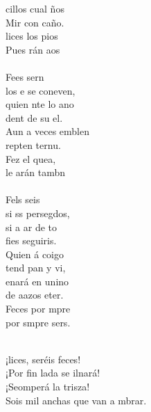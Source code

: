 \begin{cancion}
	cillos cual ños\\
	Mir con caño.\\
	lices los pios\\
	Pues rán aos\\
\jump\\
	Fees sern\\
	los e se coneven,\\
	quien nte lo ano\\
	dent de su el.\\
	Aun a veces emblen\\
	repten ternu.\\
	Fez el quea,\\
	le arán tambn\\
\jump\\
	Fels seis \\
	si ss persegdos,\\
	si a ar de to\\
	fies seguiris.\\
	Quien á coigo\\
	tend pan y vi,  \\
	enará en unino\\
	de aazos eter.\\
	Feces por mpre\\
	por smpre sers.\\\jump\\
	\begin{chorus}%
	¡lices, seréis feces! \\
	¡Por fin lada se ilnará!\\
	¡Seomperá la trisza!\\
	Sois mil anchas que van a mbrar.\\

\end{chorus}
\end{cancion}

